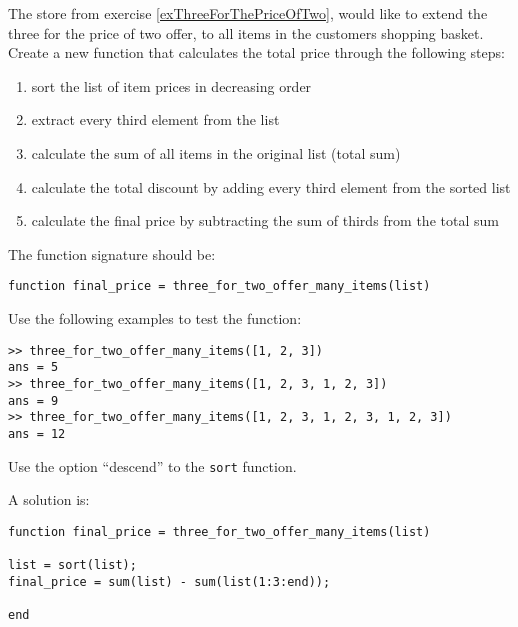 \begin{ex}
The store from exercise \ref{exThreeForThePriceOfTwo}, would like
to extend the three for the price of two offer, to all items
in the customers shopping basket.
Create a new function that calculates the total price through 
the following steps:
\begin{enumerate}
\item	sort the list of item prices in decreasing order
\item	extract every third element from the list
\item	calculate the sum of all items in the original list (total sum)
\item	calculate the total discount by adding every third element from the sorted list
\item 	calculate the final price by subtracting the sum of thirds from the total sum
\end{enumerate}
The function signature should be:
\begin{lstlisting}
function final_price = three_for_two_offer_many_items(list)
\end{lstlisting}
Use the following examples to test the function:
\begin{lstlisting}
>> three_for_two_offer_many_items([1, 2, 3])
ans = 5
>> three_for_two_offer_many_items([1, 2, 3, 1, 2, 3])
ans = 9
>> three_for_two_offer_many_items([1, 2, 3, 1, 2, 3, 1, 2, 3])
ans = 12
\end{lstlisting}
\begin{hint}
Use the option ``descend'' to the \verb!sort! function.
\end{hint}
\begin{sol}
A solution is:
\begin{lstlisting}
function final_price = three_for_two_offer_many_items(list)

list = sort(list);
final_price = sum(list) - sum(list(1:3:end));

end
\end{lstlisting}
\end{sol}
\end{ex}



